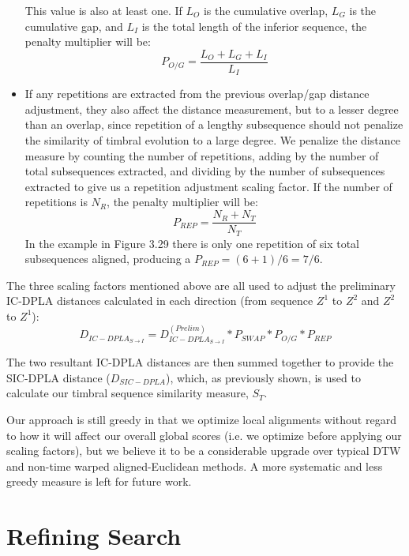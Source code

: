 \documentclass[a4paper,12pt]{report} 	%
\numberwithin{figure}{chapter}
\numberwithin{table}{chapter}
\numberwithin{equation}{chapter}
\begin{document}
\begin{flushleft}
\begin{itemize}
\begin{figure}[h!]
\begin{center}
\end{center}
\end{figure}
This value is also at least one. If $L_O$ is the cumulative overlap, $L_G$ is the cumulative gap, and $L_I$ is the total length of the inferior sequence, the penalty multiplier will be:
\begin{equation}
P_{O/G} = \frac{L_O+L_G+L_I}{L_I}
\end{equation}
\item If any repetitions are extracted from the previous overlap/gap distance adjustment, they also affect the distance measurement, but to a lesser degree than an overlap, since repetition of a lengthy subsequence should not penalize the similarity of timbral evolution to a large degree. We penalize the distance measure by counting the number of repetitions, adding by the number of total subsequences extracted, and dividing by the number of subsequences extracted to give us a repetition adjustment scaling factor. If the number of repetitions is $N_R$, the penalty multiplier will be:
\begin{equation}
P_{REP} = \frac{N_R+N_T}{N_T}
\end{equation}
In the example in Figure 3.29 there is only one repetition of six total subsequences aligned, producing a $P_{REP}=(6+1)/6=7/6$.
\end{itemize}
The three scaling factors mentioned above are all used to adjust the preliminary IC-DPLA distances calculated in each direction (from sequence $Z^1$ to $Z^2$ and $Z^2$ to $Z^1$):
\begin{equation}
D_{IC-DPLA_{S \to I}} = D_{IC-DPLA_{S \to I}}^{(Prelim)} * P_{SWAP} * P_{O/G} * P_{REP}
\end{equation}

The two resultant IC-DPLA distances are then summed together to provide the SIC-DPLA distance ($D_{SIC-DPLA}$), which, as previously shown, is used to calculate our timbral sequence similarity measure, $S_T$.

Our approach is still greedy in that we optimize local alignments without regard to how it will affect our overall global scores (i.e. we optimize before applying our scaling factors), but we believe it to be a considerable upgrade over typical DTW and non-time warped aligned-Euclidean methods. A more systematic and less greedy measure is left for future work.

\section{Refining Search}

\end{flushleft}
\end{document}
